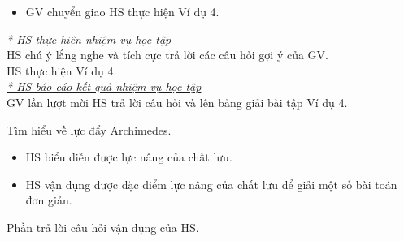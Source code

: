 {\begin{itemize}[label=-]
			$$\sum\vec{F}=\vec{0}\hspace{0.5cm} (*)$$
			Để giải phương trình (*), thông thường có thể sử dụng 2 cách:
			\begin{itemize}
				\item \textbf{Cách 1:} Chọn hệ trục tọa độ vuông góc $Oxy$ rồi chiếu phương trình (*) lên các trục $Ox$ và $Oy$ tương ứng.
				\item \textbf{Cách 2:} Sử dụng quy tắc đa giác vector.
			\end{itemize}
			\item GV chuyển giao HS thực hiện Ví dụ 4.
	\end{itemize}
	\textit{\underline{* HS thực hiện nhiệm vụ học tập}}\\
	HS chú ý lắng nghe và tích cực trả lời các câu hỏi gợi ý của GV.\\
	HS thực hiện Ví dụ 4.\\
	\textit{\underline{* HS báo cáo kết quả nhiệm vụ học tập}}\\
	GV lần lượt mời HS trả lời câu hỏi và lên bảng giải bài tập Ví dụ 4.
}
\hoatdong
{Tìm hiểu về lực đẩy Archimedes.
}
{\begin{itemize}
		\item HS biểu diễn được lực nâng của chất lưu.
		\item HS vận dụng được đặc điểm lực nâng của chất lưu để giải một số bài toán đơn giản.
	\end{itemize}
}
{Phần trả lời câu hỏi vận dụng của HS.
}
